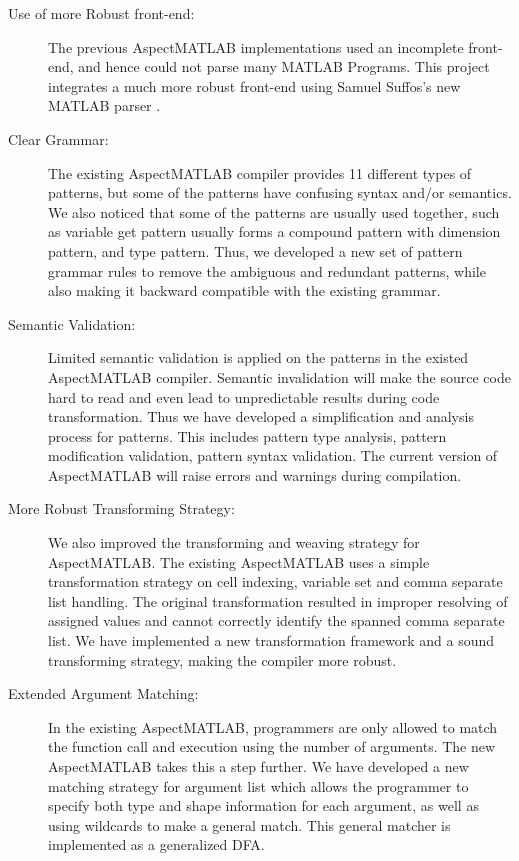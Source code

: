 \documentclass[preprint]{sig-alternate-05-2015}
\begin{document}
\begin{description}
\item[Use of more Robust front-end:]
The previous AspectMATLAB implementations used an incomplete front-end,
and hence could not parse many MATLAB Programs. This project integrates a much
more robust front-end using Samuel Suffos's new MATLAB parser
\cite{MclabParser}. 

\item[Clear Grammar:] The existing AspectMATLAB compiler provides 11
different types of patterns, but some of the patterns have confusing
syntax and/or semantics. We also noticed that some of the patterns are
usually used together, such as variable get pattern usually forms a
compound pattern with dimension pattern, and type pattern. Thus, we
developed a new set of pattern grammar rules to remove the ambiguous and
redundant patterns, while also making it backward compatible with the
existing grammar.

\item[Semantic Validation:] Limited semantic validation is applied on
the patterns in the existed AspectMATLAB compiler. Semantic invalidation
will make the source code hard to read and even lead to unpredictable
results during code transformation. Thus we have developed a
simplification and analysis process for patterns. This includes pattern
type analysis, pattern modification validation, pattern syntax
validation. The current version of AspectMATLAB will raise errors and
warnings during compilation.

\item[More Robust Transforming Strategy:] We also improved the
transforming and weaving strategy for AspectMATLAB. The existing
AspectMATLAB uses a simple transformation strategy on cell indexing,
variable set and comma separate list handling. The original
transformation resulted in improper resolving of assigned values and cannot
correctly identify the spanned comma separate list. We have implemented a
new transformation framework and a sound transforming strategy, making
the compiler more robust.

\item[Extended Argument Matching:] In the existing AspectMATLAB,
programmers are only allowed to match the function call and execution
using the number of arguments. The new AspectMATLAB takes this a step
further. We have developed a new matching strategy for argument list
which allows the programmer to specify both type and shape information
for each argument, as well as using wildcards to make a general match.
This general matcher is implemented as a generalized DFA.
\end{description}
\end{document}
